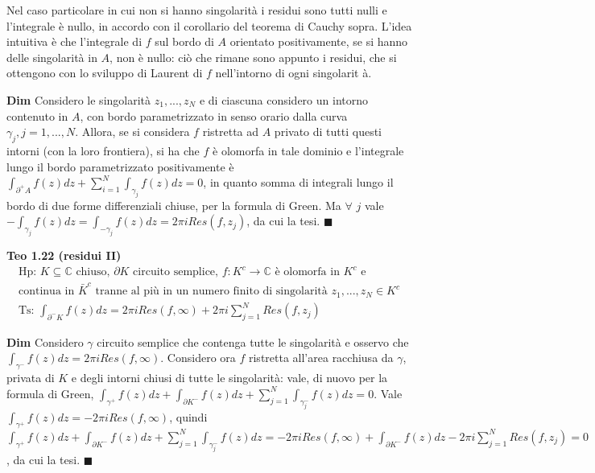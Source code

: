 \documentclass{article}
\begin{document}
Nel caso particolare in cui non si hanno singolarit\`{a} i residui sono
tutti nulli e l'integrale \`{e} nullo, in accordo con il corollario del
teorema di Cauchy sopra. L'idea intuitiva \`{e} che l'integrale di $f$ sul
bordo di $A$ orientato positivamente, se si hanno delle singolarit\`{a} in $%
A $, non \`{e} nullo: ci\`{o} che rimane sono appunto i residui, che si
ottengono con lo sviluppo di Laurent di $f$ nell'intorno di ogni singolarit%
\`{a}.

\textbf{Dim} Considero le singolarit\`{a} $z_{1},...,z_{N}$ e di ciascuna
considero un intorno contenuto in $A$, con bordo parametrizzato in senso
orario dalla curva $\gamma _{j},j=1,...,N$. Allora, se si considera $f$
ristretta ad $A$ privato di tutti questi intorni (con la loro frontiera), si
ha che $f$ \`{e} olomorfa in tale dominio e l'integrale lungo il bordo
parametrizzato positivamente \`{e} $\int_{\partial ^{+}A}f\left( z\right)
dz+\sum_{i=1}^{N}\int_{\gamma _{j}}f\left( z\right) dz=0$, in quanto somma
di integrali lungo il bordo di due forme differenziali chiuse, per la
formula di Green. Ma $\forall $ $j$ vale $-\int_{\gamma _{j}}f\left(
z\right) dz=\int_{-\gamma _{j}}f\left( z\right) dz=2\pi iRes\left(
f,z_{j}\right) $, da cui la tesi. $\blacksquare $

\textbf{Teo 1.22 (residui II)}%
\begin{gather*}
\text{Hp: }K\subseteq 
\mathbb{C}
\text{ chiuso, }\partial K\text{ circuito semplice, }f:K^{c}\rightarrow 
\mathbb{C}
\text{ \`{e} olomorfa in }K^{c}\text{ e} \\
\text{continua in }\bar{K}^{c}\text{ tranne al pi\`{u} in un numero finito
di singolarit\`{a} }z_{1},...,z_{N}\in K^{c} \\
\text{Ts: }\int_{\partial ^{-}K}f\left( z\right) dz=2\pi iRes\left( f,\infty
\right) +2\pi i\sum_{j=1}^{N}Res\left( f,z_{j}\right)
\end{gather*}

\textbf{Dim} Considero $\gamma $ circuito semplice che contenga tutte le
singolarit\`{a} e osservo che $\int_{\gamma ^{-}}f\left( z\right) dz=2\pi
iRes\left( f,\infty \right) $. Considero ora $f$ ristretta all'area
racchiusa da $\gamma $, privata di $K$ e degli intorni chiusi di tutte le
singolarit\`{a}: vale, di nuovo per la formula di Green, $\int_{\gamma
^{+}}f\left( z\right) dz+\int_{\partial K^{-}}f\left( z\right)
dz+\sum_{j=1}^{N}\int_{\gamma _{j}^{-}}f\left( z\right) dz=0$. Vale $%
\int_{\gamma ^{+}}f\left( z\right) dz=-2\pi iRes\left( f,\infty \right) $,
quindi $\int_{\gamma ^{+}}f\left( z\right) dz+\int_{\partial K^{-}}f\left(
z\right) dz+\sum_{j=1}^{N}\int_{\gamma _{j}^{-}}f\left( z\right) dz=-2\pi
iRes\left( f,\infty \right) +\int_{\partial K^{-}}f\left( z\right) dz-2\pi
i\sum_{j=1}^{N}Res\left( f,z_{j}\right) =0$, da cui la tesi. $\blacksquare $
\end{document}
